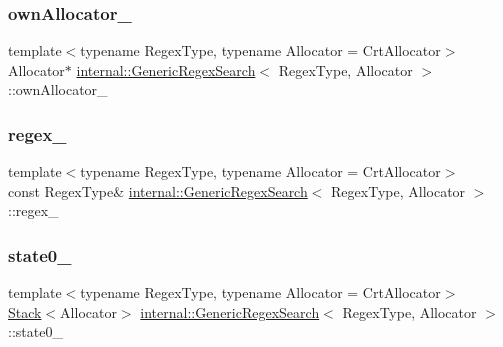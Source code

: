 \subsubsection{\texorpdfstring{own\+Allocator\+\_\+}{ownAllocator\_}}
{\footnotesize\ttfamily template$<$typename Regex\+Type, typename Allocator = Crt\+Allocator$>$ \\
Allocator$\ast$ \hyperlink{classinternal_1_1GenericRegexSearch}{internal\+::\+Generic\+Regex\+Search}$<$ Regex\+Type, Allocator $>$\+::own\+Allocator\+\_\+\hspace{0.3cm}{\ttfamily [private]}}

\mbox{\label{classinternal_1_1GenericRegexSearch_aaec69557b0641a19b337ebd44b6d7a7b}} 
\subsubsection{\texorpdfstring{regex\+\_\+}{regex\_}}
{\footnotesize\ttfamily template$<$typename Regex\+Type, typename Allocator = Crt\+Allocator$>$ \\
const Regex\+Type\& \hyperlink{classinternal_1_1GenericRegexSearch}{internal\+::\+Generic\+Regex\+Search}$<$ Regex\+Type, Allocator $>$\+::regex\+\_\+\hspace{0.3cm}{\ttfamily [private]}}

\mbox{\label{classinternal_1_1GenericRegexSearch_a6b44c058a10cff21c2e3d20d32b84eba}} 
\subsubsection{\texorpdfstring{state0\+\_\+}{state0\_}}
{\footnotesize\ttfamily template$<$typename Regex\+Type, typename Allocator = Crt\+Allocator$>$ \\
\hyperlink{classinternal_1_1Stack}{Stack}$<$Allocator$>$ \hyperlink{classinternal_1_1GenericRegexSearch}{internal\+::\+Generic\+Regex\+Search}$<$ Regex\+Type, Allocator $>$\+::state0\+\_\+\hspace{0.3cm}{\ttfamily [private]}}

